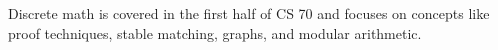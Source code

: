 Discrete math is covered in the first half of CS 70 and focuses on concepts like proof techniques, stable matching, graphs, and modular arithmetic.
